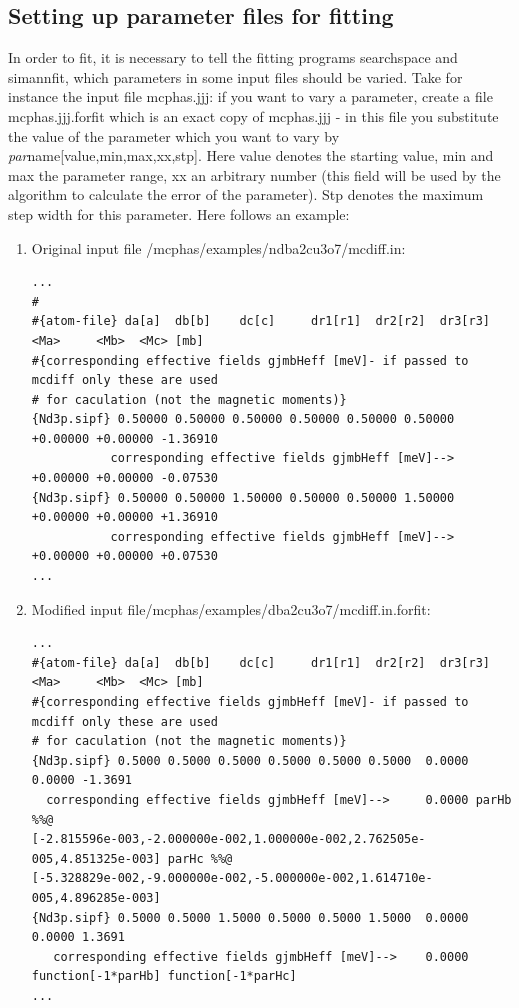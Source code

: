 \subsection{Setting up parameter files for fitting}

In order to fit, it is necessary to tell the fitting programs {\prg searchspace} and
 {\prg simannfit}, which 
parameters in some input files should be varied. Take for instance
the input file {\prg mcphas.jjj}: if you want to vary a parameter, create a file 
{\prg mcphas.jjj.forfit} which is an exact copy of {\prg mcphas.jjj} - in 
this file you substitute the value of the parameter which you want to vary  
 by {\em par}name[value,min,max,xx,stp].
 Here value denotes the starting value, min and max the parameter range, xx an arbitrary
 number (this field will be used by the algorithm to calculate the error of the
 parameter). Stp denotes the maximum step width for this parameter.
Here follows an example:

\begin{enumerate}
\item Original input file {\prg /mcphas/examples/ndba2cu3o7/mcdiff.in}:
{\footnotesize
\begin{verbatim}
...
#
#{atom-file} da[a]  db[b]    dc[c]     dr1[r1]  dr2[r2]  dr3[r3]   <Ma>     <Mb>  <Mc> [mb]
#{corresponding effective fields gjmbHeff [meV]- if passed to mcdiff only these are used 
# for caculation (not the magnetic moments)}
{Nd3p.sipf} 0.50000 0.50000 0.50000 0.50000 0.50000 0.50000 +0.00000 +0.00000 -1.36910  
           corresponding effective fields gjmbHeff [meV]--> +0.00000 +0.00000 -0.07530
{Nd3p.sipf} 0.50000 0.50000 1.50000 0.50000 0.50000 1.50000 +0.00000 +0.00000 +1.36910  
           corresponding effective fields gjmbHeff [meV]--> +0.00000 +0.00000 +0.07530
...
\end{verbatim}
}

	
\item Modified input file{\prg /mcphas/examples/dba2cu3o7/mcdiff.in.forfit}: 
{\footnotesize
\begin{verbatim}
...
#{atom-file} da[a]  db[b]    dc[c]     dr1[r1]  dr2[r2]  dr3[r3]   <Ma>     <Mb>  <Mc> [mb]
#{corresponding effective fields gjmbHeff [meV]- if passed to mcdiff only these are used 
# for caculation (not the magnetic moments)}
{Nd3p.sipf} 0.5000 0.5000 0.5000 0.5000 0.5000 0.5000  0.0000 0.0000 -1.3691  
  corresponding effective fields gjmbHeff [meV]-->     0.0000 parHb %%@
[-2.815596e-003,-2.000000e-002,1.000000e-002,2.762505e-005,4.851325e-003] parHc %%@
[-5.328829e-002,-9.000000e-002,-5.000000e-002,1.614710e-005,4.896285e-003]
{Nd3p.sipf} 0.5000 0.5000 1.5000 0.5000 0.5000 1.5000  0.0000 0.0000 1.3691  
   corresponding effective fields gjmbHeff [meV]-->    0.0000 function[-1*parHb] function[-1*parHc]
...
\end{verbatim}
}

\end{enumerate}

